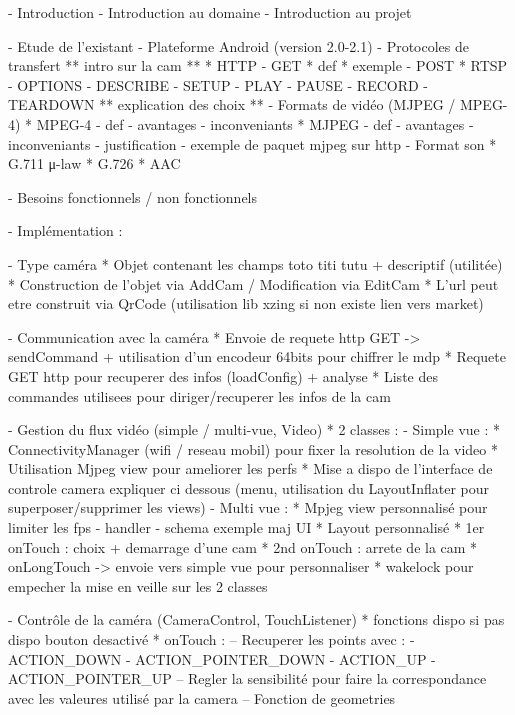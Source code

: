 - Introduction
  - Introduction au domaine
  - Introduction au projet

- Etude de l'existant
  - Plateforme Android (version 2.0-2.1)
  - Protocoles de transfert
    ** intro sur la cam **
    * HTTP
      - GET
       * def
       * exemple
      - POST
    * RTSP
      - OPTIONS
      - DESCRIBE
      - SETUP
      - PLAY
      - PAUSE
      - RECORD
      - TEARDOWN
     ** explication des choix **
  - Formats de vidéo (MJPEG / MPEG-4)
     * MPEG-4
      - def
      - avantages
      - inconveniants
     * MJPEG
      - def
      - avantages
      - inconveniants
      - justification
      - exemple de paquet mjpeg sur http      
  - Format son
     * G.711 μ-law
     * G.726
     * AAC
     
  

- Besoins fonctionnels / non fonctionnels


- Implémentation :

  - Type caméra 
    * Objet contenant les champs toto titi tutu + descriptif (utilitée)
    * Construction de l'objet via AddCam / Modification via EditCam
    * L'url peut etre construit via QrCode (utilisation lib xzing si non existe
    lien vers market)
    
  - Communication avec la caméra
    * Envoie de requete http GET -> sendCommand + utilisation d'un encodeur
      64bits pour chiffrer le mdp
    * Requete GET http pour recuperer des infos (loadConfig) + analyse
    * Liste des commandes utilisees pour diriger/recuperer les infos de la cam 
    
  - Gestion du flux vidéo (simple / multi-vue, Video)
    * 2 classes : 
        - Simple vue :
            * ConnectivityManager (wifi / reseau mobil) pour fixer la
            resolution de la video * Utilisation Mjpeg view pour ameliorer les perfs
            * Mise a dispo de l'interface de controle camera expliquer ci
              dessous (menu, utilisation du LayoutInflater pour
              superposer/supprimer les views)
         - Multi vue : 
            * Mpjeg view personnalisé pour limiter les fps
               - handler 
               - schema exemple maj UI
            * Layout personnalisé
            * 1er onTouch : choix + demarrage d'une cam
            * 2nd onTouch : arrete de la cam
            * onLongTouch -> envoie vers simple vue pour personnaliser
    * wakelock pour empecher la mise en veille sur les 2 classes
    
  - Contrôle de la caméra (CameraControl, TouchListener)
    * fonctions dispo si pas dispo bouton desactivé
    * onTouch : 
        -- Recuperer les points avec : 
         - ACTION_DOWN
         - ACTION_POINTER_DOWN
         - ACTION_UP
         - ACTION_POINTER_UP
        -- Regler la sensibilité pour faire la correspondance avec les valeures
           utilisé par la camera
        -- Fonction de geometries   
    
